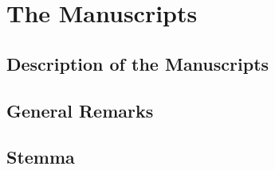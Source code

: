 \chapter{The Manuscripts}

\section{Description of the Manuscripts}
\section{General Remarks}
\section{Stemma}